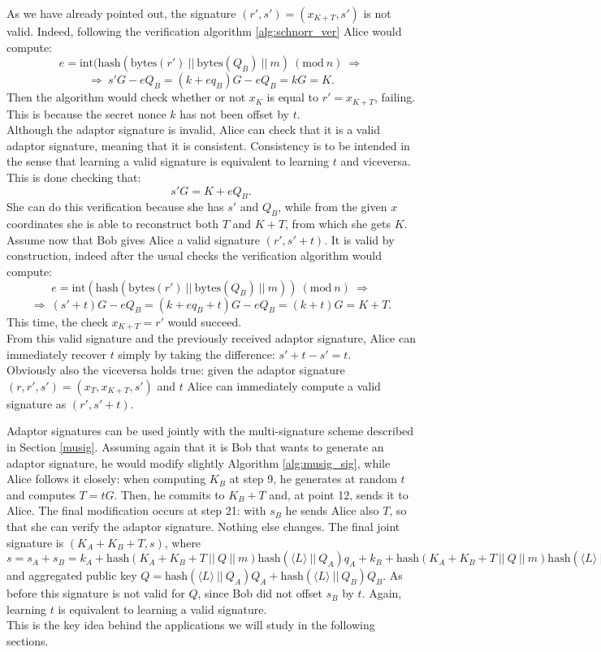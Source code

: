 \bigskip
\noindent
As we have already pointed out, the signature $(r', s') = (x_{K + T}, s')$ is not valid. Indeed, following the verification algorithm \ref{alg:schnorr_ver} Alice would compute:
$$e = \text{int}(\text{hash}(\text{bytes}(r') \ || \ \text{bytes}(Q_B) \ || \ m) \ (\text{mod} \ n) \ \Longrightarrow$$
$$\Longrightarrow \ s'G - eQ_B = (k + eq_B)G - eQ_B = kG = K.$$
Then the algorithm would check whether or not $x_K$ is equal to $r' = x_{K + T}$, failing. This is because the secret nonce $k$ has not been offset by $t$.
\\
Although the adaptor signature is invalid, Alice can check that it is a valid adaptor signature, meaning that it is consistent. Consistency is to be intended in the sense that learning a valid signature is equivalent to learning $t$ and viceversa. This is done checking that:
$$s'G = K + eQ_B.$$
She can do this verification because she has $s'$ and $Q_B$, while from the given $x$ coordinates she is able to reconstruct both $T$ and $K + T$, from which she gets $K$.
\\
Assume now that Bob gives Alice a valid signature $(r', s' + t)$. It is valid by construction, indeed after the usual checks the verification algorithm would compute:
$$e = \text{int}(\text{hash}(\text{bytes}(r') \ || \ \text{bytes}(Q_B) \ || \ m)) \ (\text{mod} \ n) \ \Longrightarrow$$
$$\Longrightarrow \ (s' + t)G - eQ_B = (k + eq_B + t)G - eQ_B = (k + t)G = K + T.$$
This time, the check $x_{K + T} = r'$ would succeed. 
\\
From this valid signature and the previously received adaptor signature, Alice can immediately recover $t$ simply by taking the difference: $s' + t - s' = t$.
\\
Obviously also the viceversa holds true: given the adaptor signature $(r, r', s') = (x_T, x_{K + T}, s')$ and $t$ Alice can immediately compute a valid signature as $(r', s' + t)$.

\bigskip
\noindent
Adaptor signatures can be used jointly with the multi-signature scheme described in Section \ref{musig}. Assuming again that it is Bob that wants to generate an adaptor signature, he would modify slightly Algorithm \ref{alg:musig_sig}, while Alice follows it closely: when computing $K_B$ at step 9, he generates at random $t$ and computes $T = tG$. Then, he commits to $K_B + T$ and, at point 12, sends it to Alice. The final modification occurs at step 21: with $s_B$ he sends Alice also $T$, so that she can verify the adaptor signature. Nothing else changes. The final joint signature is $(K_A + K_B + T, s)$, where $s = s_A + s_B = k_A + \text{hash}(K_A + K_B + T \ || \ Q \ || \ m)\text{hash}(\langle L \rangle \ || \ Q_A)q_A + k_B + \text{hash}(K_A + K_B + T \ || \ Q \ || \ m)\text{hash}(\langle L \rangle \ || \ Q_B)q_B$ and aggregated public key $Q =  \text{hash}(\langle L \rangle \ || \ Q_A)Q_A + \text{hash}(\langle L \rangle \ || \ Q_B)Q_B$. As before this signature is not valid for $Q$, since Bob did not offset $s_B$ by $t$. Again, learning $t$ is equivalent to learning a valid signature.
\\
This is the key idea behind the applications we will study in the following sections.

